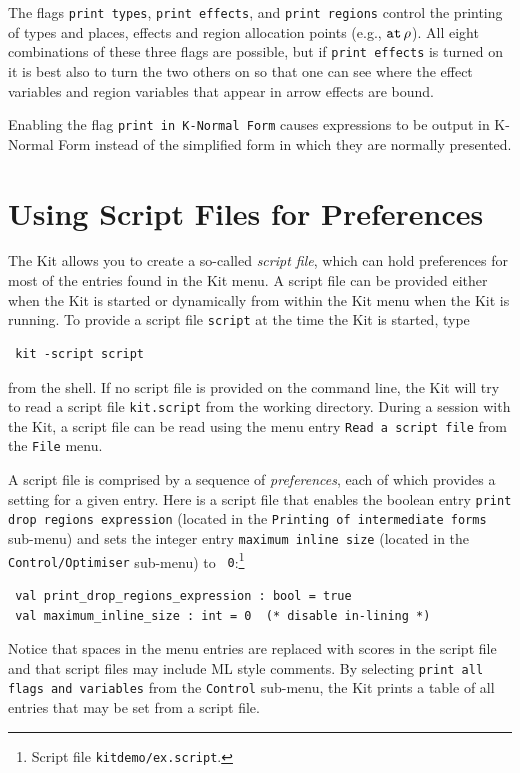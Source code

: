 \documentclass[12pt]{book}
\begin{document}
The flags 
%
\texttt{print types},
%
\texttt{print effects}, and
%
\texttt{print regions} control the printing of types and places,
effects and region allocation points (e.g., $\mathbin{\hbox{\tt at}}\,\rho$).
All eight combinations of these three flags are possible, but if
%
{\tt print effects} is turned on it is best also to turn the two
others on so that one can see where the effect variables and region variables
that appear in arrow effects are bound.

Enabling the flag
%
\texttt{print in K-Normal Form} causes
expressions to be output in K-Normal Form instead of the simplified
form in which they are normally presented.

\section{Using Script Files for Preferences}
\label{scriptfiles.sec}
The Kit allows you to create a so-called 
%
{\em script file}, which can hold preferences for most of the entries
found in the Kit menu. A script file can be provided either when the
Kit is started or dynamically from within the Kit menu when the Kit is
running. To provide a script file {\tt script} at the time the Kit is
started, type
\begin{verbatim}
 kit -script script
\end{verbatim}
from the shell. If no script file is provided on the command line, the
Kit will try to read a script file
%
{\tt kit.script} from the working directory. During a session with the
Kit, a script file can be read using the menu entry {\tt Read a script
  file} from the {\tt File} menu.

A script file is comprised by a sequence of 
%
{\em preferences}, each of which provides a setting for a given entry.
Here is a script file that enables the boolean entry {\tt print drop
  regions expression} (located in the {\tt Printing of intermediate
  forms} sub-menu) and sets the integer entry {\tt maximum inline
  size} (located in the {\tt Control/Optimiser} sub-menu) to {\tt
  0}:\footnote{Script file {\tt kitdemo/ex.script}.}
\begin{verbatim}
 val print_drop_regions_expression : bool = true 
 val maximum_inline_size : int = 0  (* disable in-lining *)
\end{verbatim}
Notice that spaces in the menu entries are replaced with scores in the
script file and that script files may include ML style comments. By
selecting {\tt print all flags and variables} from the {\tt Control}
sub-menu, the Kit prints a table of all entries that may be set from a
script file.
\end{document}
